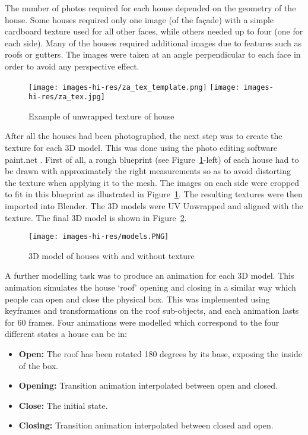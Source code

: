 \documentclass{egpubl}
\begin{document}
 The number of photos required for each house depended on the geometry of the
 house. Some houses required only one image (of the fa\c{c}ade) with a simple
 cardboard texture used for all other faces, while others needed up to four
 (one for each side). Many of the houses required additional images due to
 features such as roofs or gutters. The images were taken at an angle
 perpendicular to each face in order to avoid any perspective effect. 

 \begin{figure}[ht] \centering
\texttt{[image: images-hi-res/za\_tex\_template.png]}
\texttt{[image: images-hi-res/za\_tex.jpg]}
\caption{Example of unwrapped texture of house} \label{fig:pattern}
\end{figure}


After all the houses had been photographed, the next step was to create the
texture for each 3D model. This was done using the photo editing software
paint.net \cite{paintnet}. First of all, a rough blueprint (see
Figure~\ref{fig:pattern}-left) of each house had to be drawn with
approximately the right measurements so as to avoid distorting the texture
when applying it to the mesh. The images on each side were cropped to fit in
this blueprint as illustrated in Figure~\ref{fig:pattern}. The resulting
textures were then imported into Blender. The 3D models were UV Unwrapped and
aligned with the texture. The final 3D model is shown in
Figure~\ref{fig:3Dhouse}. 




\begin{figure}[ht] \centering
\texttt{[image: images-hi-res/models.PNG]} \caption{3D model
of houses with and without texture} \label{fig:3Dhouse} 
\end{figure}

A further modelling task was to produce an animation for each 3D model. This
animation simulates the house `roof' opening and closing in a similar way
which people can open and close the physical box. This was implemented using
keyframes and transformations on the roof sub-objects, and each animation
lasts for 60 frames. Four animations were modelled which correspond to the
four different states a house can be in: 

\begin{itemize} 
  \item \textbf{Open:}
The roof has been rotated 180 degrees by its base, exposing the inside of the
box. 
\item \textbf{Opening:} Transition animation interpolated between open
and closed. 
\item \textbf{Close:} The initial state.  
\item \textbf{Closing:} Transition animation interpolated between closed and open. 

\end{itemize}
\end{document}
